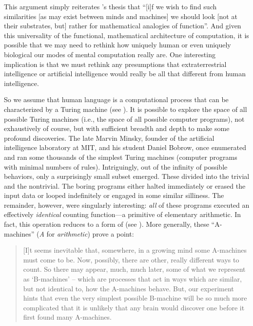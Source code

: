 \documentclass[output=paper]{langsci/langscibook}
\begin{document}
This argument simply reiterates \citeauthor{Turing1950}’s thesis
\parencite[446]{Turing1950} that “[i]f we wish to find such similarities [as
may exist between minds and machines] we should look [not at their substrates,
but] rather for mathematical analogies of function”.  And given this
universality of the functional, mathematical architecture of computation, it is
possible that we may need to rethink how uniquely human or even uniquely
biological our modes of mental computation really are. One interesting
implication is that we must rethink any presumptions that extraterrestrial
intelligence or artificial intelligence would really be all that different from
human intelligence.

So we assume that human language is a computational process that can be
characterized by a Turing machine (see \citealt{Watumull2015}). It is possible
to explore the space of all possible Turing machines (i.e., the space of all
possible computer programs), not exhaustively of course, but with sufficient
breadth and depth to make some profound discoveries. The late Marvin Minsky,
founder of the artificial intelligence laboratory at MIT, and his student
{Daniel Bobrow, once enumerated and ran some thousands of the
simplest Turing machines (computer programs with minimal numbers of rules).}{}
{Intriguingly, out of the infinity of possible behaviors, only a
surprisingly small subset emerged.} {These divided into the
trivial and the nontrivial.} {The boring programs either halted
immediately or erased the input data or looped indefinitely or engaged in some
similar silliness.} {The remainder, however, were singularly
interesting: \emph{all} of these programs executed an effectively
\emph{identical} counting function—a primitive of elementary
arithmetic.} {In fact, this operation reduces to a form of 
(see \citealt{Chomsky2008}).} {More generally, these “A-machines”
(\emph{A} for \emph{arithmetic}) prove a point:}

\begin{quote}
    [I]t seems inevitable that, somewhere, in a growing mind some A-machines
    must come to be. Now, possibly, there are other, really different ways to
    count. So there may appear, much, much later, some of what we represent as
    ‘B-machines’ – which are processes that act in ways which are similar, but
    not identical to, how the A-machines behave. But, our experiment hints that
    even the very simplest possible B-machine will be so much more complicated
    that it is unlikely that any brain would discover one before it first found
    many A-machines. \parencite[121]{Minsky1985}
\end{quote}
\end{document}
